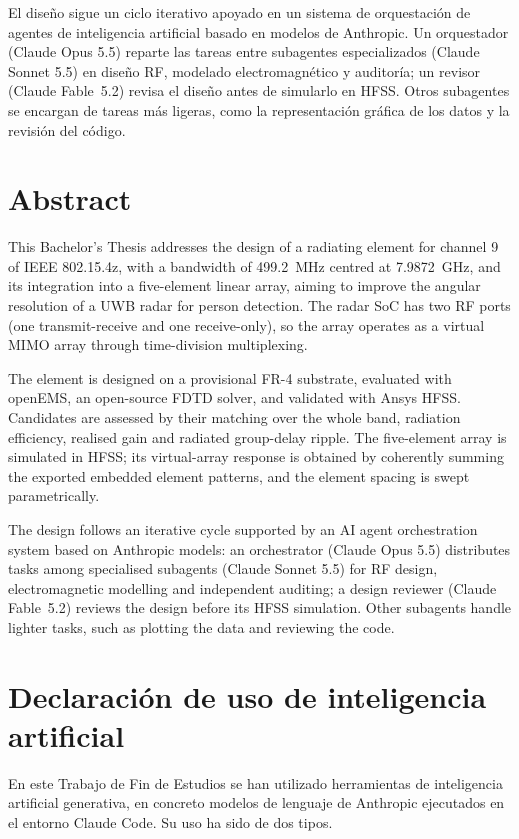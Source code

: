 \documentclass[11pt,a4paper]{article}
\begin{document}
El diseño sigue un ciclo iterativo apoyado en un sistema de orquestación de agentes de
inteligencia artificial basado en modelos de Anthropic. Un orquestador (Claude Opus 5.5) reparte
las tareas entre subagentes especializados (Claude Sonnet 5.5) en diseño RF, modelado
electromagnético y auditoría; un revisor (Claude Fable~5.2) revisa el diseño antes de simularlo
en HFSS. Otros subagentes se encargan de tareas más ligeras, como la
representación gráfica de los datos y la revisión del código.

\newpage
\section*{Abstract}
{This Bachelor's Thesis addresses the design of a radiating element for channel 9 of IEEE
802.15.4z, with a bandwidth of \SI{499.2}{MHz} centred at \SI{7.9872}{GHz}, and its integration
into a five-element linear array, aiming to improve the angular resolution of a UWB radar for
person detection. The radar SoC has two RF ports (one transmit-receive and one receive-only), so the array operates as a virtual MIMO
array through time-division multiplexing.

The element is designed on a provisional FR-4 substrate, evaluated with openEMS, an open-source
FDTD solver, and validated with Ansys HFSS. Candidates are assessed by their matching over the
whole band, radiation efficiency, realised gain and radiated group-delay ripple. The five-element
array is simulated in HFSS; its virtual-array response is obtained by coherently summing the
exported embedded element patterns, and the element spacing is swept parametrically.

The design follows an iterative cycle supported by an AI agent orchestration system based on
Anthropic models: an orchestrator (Claude Opus 5.5) distributes tasks among specialised
subagents (Claude Sonnet 5.5) for RF design, electromagnetic modelling and independent auditing;
a design reviewer (Claude Fable~5.2) reviews the design before its HFSS simulation. Other
subagents handle lighter tasks, such as plotting the data and reviewing the code.}

\newpage
\section*{Declaración de uso de inteligencia artificial}
En este Trabajo de Fin de Estudios se han utilizado herramientas de inteligencia artificial
generativa, en concreto modelos de lenguaje de Anthropic ejecutados en el entorno Claude Code. Su
uso ha sido de dos tipos.
\end{document}
